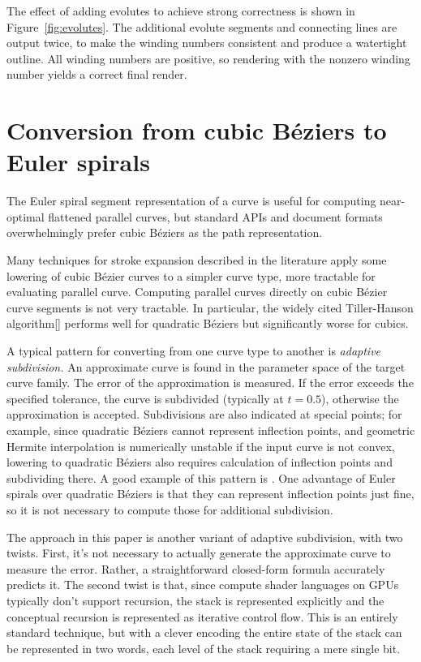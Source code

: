 \documentclass[sigconf]{acmart}
\begin{document}
The effect of adding evolutes to achieve strong correctness is shown in Figure~\ref{fig:evolutes}. The additional evolute segments and connecting lines are output twice, to make the winding numbers consistent and produce a watertight outline. All winding numbers are positive, so rendering with the nonzero winding number yields a correct final render.

\section{Conversion from cubic Béziers to Euler spirals}

The Euler spiral segment representation of a curve is useful for computing near-optimal flattened parallel curves, but standard APIs and document formats overwhelmingly prefer cubic Béziers as the path representation.

Many techniques for stroke expansion described in the literature apply some lowering of cubic Bézier curves to a simpler curve type, more tractable for evaluating parallel curve. Computing parallel curves directly on cubic Bézier curve segments is not very tractable. In particular, the widely cited Tiller-Hanson algorithm[] performs well for quadratic Béziers but significantly worse for cubics.


A typical pattern for converting from one curve type to another is \emph{adaptive subdivision.} An approximate curve is found in the parameter space of the target curve family. The error of the approximation is measured. If the error exceeds the specified tolerance, the curve is subdivided (typically at $t = 0.5$), otherwise the approximation is accepted. Subdivisions are also indicated at special points; for example, since quadratic Béziers cannot represent inflection points, and geometric Hermite interpolation is numerically unstable if the input curve is not convex, lowering to quadratic Béziers also requires calculation of inflection points and subdividing there. A good example of this pattern is \citet{Nehab2020}. One advantage of Euler spirals over quadratic Béziers is that they can represent inflection points just fine, so it is not necessary to compute those for additional subdivision.

The approach in this paper is another variant of adaptive subdivision, with two twists. First, it's not necessary to actually generate the approximate curve to measure the error. Rather, a straightforward closed-form formula accurately predicts it. The second twist is that, since compute shader languages on GPUs typically don't support recursion, the stack is represented explicitly and the conceptual recursion is represented as iterative control flow. This is an entirely standard technique, but with a clever encoding the entire state of the stack can be represented in two words, each level of the stack requiring a mere single bit.
\end{document}
